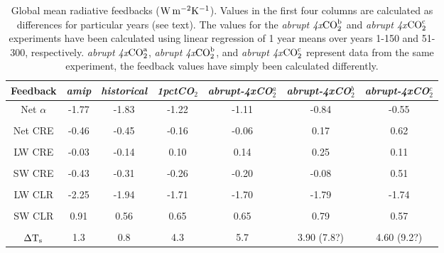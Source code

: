 \documentclass[draft]{agujournal2019}
\begin{document}
\begin{table}
\begin{center}
\caption{Global mean radiative feedbacks ($\rm{W\, m^{-2} K^{-1}}$).  Values in the first four columns are calculated as differences for 
particular years (see text).  The values for the \textit{abrupt 4x$\rm{CO}_2^{b}$} and  \textit{abrupt 4x$\rm{CO}_2^{c}$} experiments
have been calculated using linear regression of 1 year means over years 1-150 and 51-300, respectively.  
\textit{abrupt 4x$\rm{CO}_2^{a}$}, \textit{abrupt 4x$\rm{CO}_2^{b}$}, and \textit{abrupt 4x$\rm{CO}_2^{c}$} represent data from the same experiment, the feedback values have simply been calculated differently.
}
    \begin{tabular}{*{7}{c}}
    \hline
    \hline
 Feedback     &  \textit{amip }  & \textit{historical}   &  \textit{1pctCO$_2$} & \textit{abrupt-4xCO$_2^{a}$} & \textit{abrupt-4xCO$_2^{b}$} & \textit{abrupt-4xCO$_2^{c}$}  \\ \hline
    Net $\alpha$    & -1.77      &   -1.83      &  -1.22          &  -1.11    &  -0.84   &   -0.55              \\ 
    \\
    Net CRE  &    -0.46            &   -0.45       &  -0.16          & -0.06   & 0.17      &   0.62         \\  
    \\
    LW CRE    &   -0.03           &   -0.14        &  0.10            & 0.14   &  0.25        & 0.11          \\  
    \\
    SW CRE  &     -0.43             &    -0.31       &  -0.26            & -0.20    &  -0.08      &  0.51         \\  
    \\
    LW CLR   &     -2.25             &    -1.94       &  -1.71            & -1.70    &   -1.79      & -1.74        \\  
    \\
    SW CLR  &      0.91            &     0.56        & 0.65              & 0.65    &    0.79         & 0.57          \\  
    \\
    $\Delta \rm{T}_s$     &     1.3     & 0.8        &  4.3           & 5.7     &   3.90 (7.8?)        &   4.60 (9.2?)         \\  \hline

    \end{tabular}\par
    \label{tab:lambda_AOGCM}
\end{center}
\end{table}
\end{document}
